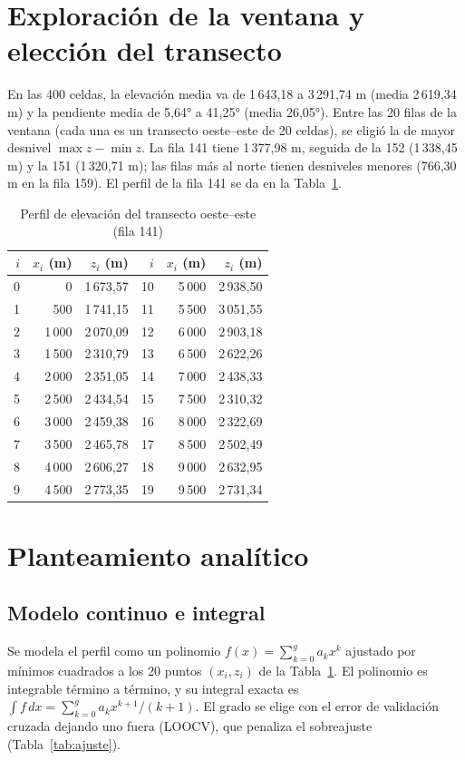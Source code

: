 \documentclass[11pt,a4paper]{article}
\begin{document}
\section{Exploración de la ventana y elección del transecto}
En las 400 celdas, la elevación media va de 1\,643,18 a 3\,291,74 m (media 2\,619,34 m) y la pendiente media de 5,64° a 41,25° (media 26,05°). Entre las 20 filas de la ventana (cada una es un transecto oeste--este de 20 celdas), se eligió la de mayor desnivel $\max z - \min z$. La fila 141 tiene 1\,377,98 m, seguida de la 152 (1\,338,45 m) y la 151 (1\,320,71 m); las filas más al norte tienen desniveles menores (766,30 m en la fila 159). El perfil de la fila 141 se da en la Tabla~\ref{tab:trans}.

\begin{table}[h]
\centering
\caption{Perfil de elevación del transecto oeste--este (fila 141)}\label{tab:trans}
\small
\begin{tabular}{rrr@{\hspace{1.2cm}}rrr}
\toprule
$i$ & $x_i$ (m) & $z_i$ (m) & $i$ & $x_i$ (m) & $z_i$ (m)\\
\midrule
0 & 0 & 1\,673,57 & 10 & 5\,000 & 2\,938,50\\
1 & 500 & 1\,741,15 & 11 & 5\,500 & 3\,051,55\\
2 & 1\,000 & 2\,070,09 & 12 & 6\,000 & 2\,903,18\\
3 & 1\,500 & 2\,310,79 & 13 & 6\,500 & 2\,622,26\\
4 & 2\,000 & 2\,351,05 & 14 & 7\,000 & 2\,438,33\\
5 & 2\,500 & 2\,434,54 & 15 & 7\,500 & 2\,310,32\\
6 & 3\,000 & 2\,459,38 & 16 & 8\,000 & 2\,322,69\\
7 & 3\,500 & 2\,465,78 & 17 & 8\,500 & 2\,502,49\\
8 & 4\,000 & 2\,606,27 & 18 & 9\,000 & 2\,632,95\\
9 & 4\,500 & 2\,773,35 & 19 & 9\,500 & 2\,731,34\\
\bottomrule
\end{tabular}
\end{table}

\section{Planteamiento analítico}
\subsection{Modelo continuo e integral}
Se modela el perfil como un polinomio $f(x) = \sum_{k=0}^{g} a_k x^k$ ajustado por mínimos cuadrados a los 20 puntos $(x_i, z_i)$ de la Tabla~\ref{tab:trans}. El polinomio es integrable término a término, y su integral exacta es $\int f\,dx = \sum_{k=0}^{g} a_k x^{k+1}/(k+1)$. El grado se elige con el error de validación cruzada dejando uno fuera (LOOCV), que penaliza el sobreajuste (Tabla~\ref{tab:ajuste}).
\end{document}
